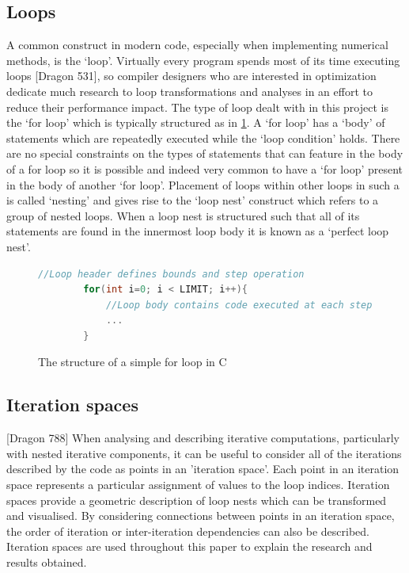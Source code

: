 \documentclass[a4paper,12pt,twoside]{report}
\begin{document}
\subsection{Loops}
A common construct in modern code, especially when implementing numerical methods, is the `loop'. Virtually every program spends most of its 
time executing loops [Dragon 531], so compiler designers who are interested in optimization dedicate much research to 
loop transformations and analyses in an effort to reduce their performance impact. The type of loop dealt with in this project is the
`for loop' which is typically structured as in \ref{fig:forloop}. A `for loop' has a `body' of statements which are repeatedly executed
while the `loop condition' holds. There are no special constraints on the types of statements that can feature in the body of a for loop so it
is possible and indeed very common to have a `for loop' present in the body of another `for loop'. Placement of loops within other loops in such a 
is called `nesting' and gives rise to the `loop nest' construct which refers to a group of nested loops. When a loop nest is structured
such that all of its statements are found in the innermost loop body it is known as a `perfect loop nest'.

\begin{figure}[h]
    \begin{lstlisting}[language=C]
        //Loop header defines bounds and step operation
        for(int i=0; i < LIMIT; i++){
            //Loop body contains code executed at each step
            ...
        }
    \end{lstlisting}
    \caption{The structure of a simple for loop in C}
    \label{fig:forloop}
\end{figure}

\subsection{Iteration spaces}
[Dragon 788]
When analysing and describing iterative computations, particularly with nested iterative components, it can be useful to consider 
all of the iterations described by the code as points in an 'iteration space'. Each point in an iteration space represents a
particular assignment of values to the loop indices. Iteration spaces provide a geometric description of loop nests which can be
transformed and visualised. By considering connections between points in an iteration space, the order of iteration or 
inter-iteration dependencies can also be described. Iteration spaces are used throughout this paper to explain the research and results obtained.
\end{document}
